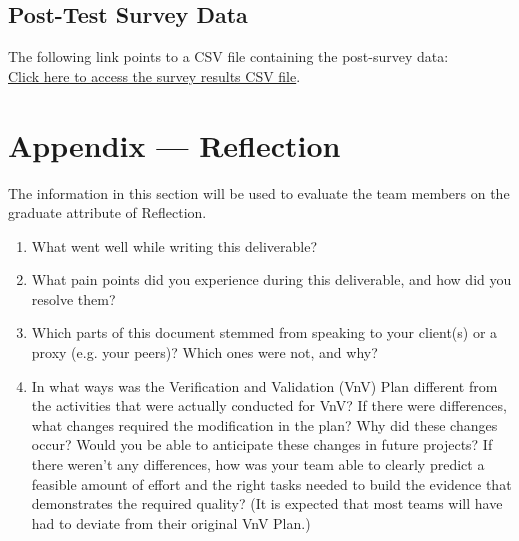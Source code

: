 \documentclass[12pt, titlepage]{article}
\begin{document}
\subsection*{Post-Test Survey Data}
The following link points to a CSV file containing the post-survey data:\\

\noindent
\href{run:./../Extras/UsabilityTesting/surveys/post-test-survey-data.csv}{Click
here to access the survey results CSV file}.

\newpage{}
\section*{Appendix --- Reflection}

The information in this section will be used to evaluate the team members on the
graduate attribute of Reflection.



\begin{enumerate}
  \item What went well while writing this deliverable?
  \item What pain points did you experience during this deliverable, and how
    did you resolve them?
  \item Which parts of this document stemmed from speaking to your client(s) or
    a proxy (e.g. your peers)? Which ones were not, and why?
  \item In what ways was the Verification and Validation (VnV) Plan different
    from the activities that were actually conducted for VnV?  If there were
    differences, what changes required the modification in the plan?  Why did
    these changes occur?  Would you be able to anticipate these
    changes in future
    projects?  If there weren't any differences, how was your team
    able to clearly
    predict a feasible amount of effort and the right tasks needed to build the
    evidence that demonstrates the required quality?  (It is expected that most
    teams will have had to deviate from their original VnV Plan.)
\end{enumerate}
\end{document}
